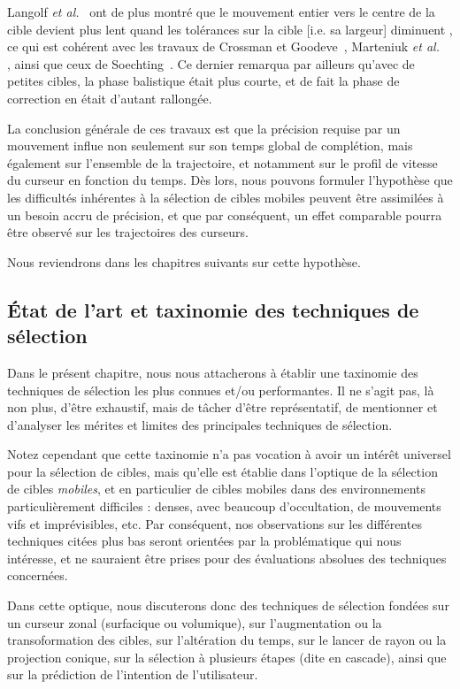	Langolf \emph{et al.}~\cite{langolf1976investigation} ont de plus montré que \og le mouvement entier vers le centre de la cible devient plus lent quand les tolérances sur la cible [i.e. sa largeur] diminuent \fg{}, ce qui est cohérent avec les travaux de Crossman et Goodeve~\cite{crossman1983feedback}, Marteniuk \emph{et al.}~ \cite{marteniuk1987constraints}, ainsi que ceux de Soechting~\cite{soechting1984effect}. Ce dernier remarqua par ailleurs qu'avec de petites cibles, la phase balistique était plus courte, et de fait la phase de correction en était d'autant rallongée.
	
	La conclusion générale de ces travaux est que la précision requise par un mouvement influe non seulement sur son temps global de complétion, mais également sur l'ensemble de la trajectoire, et notamment sur le profil de vitesse du curseur en fonction du temps. Dès lors, nous pouvons formuler l'hypothèse que les difficultés inhérentes à la sélection de cibles mobiles peuvent être assimilées à un besoin accru de précision, et que par conséquent, un effet comparable pourra être observé sur les trajectoires des curseurs.
	
	Nous reviendrons dans les chapitres suivants sur cette hypothèse.
	
	\subsection{État de l'art et taxinomie des techniques de sélection}
	Dans le présent chapitre, nous nous attacherons à établir une taxinomie des techniques de sélection les plus connues et/ou performantes. Il ne s'agit pas, là non plus, d'être exhaustif, mais de tâcher d'être représentatif, de mentionner et d'analyser les mérites et limites des principales techniques de sélection.
	
	Notez cependant que cette taxinomie n'a pas vocation à avoir un intérêt universel pour la sélection de cibles, mais qu'elle est établie dans l'optique de la sélection de cibles \emph{mobiles}, et en particulier de cibles mobiles dans des environnements particulièrement difficiles : denses, avec beaucoup d'occultation, de mouvements vifs et imprévisibles, etc. Par conséquent, nos observations sur les différentes techniques citées plus bas seront orientées par la problématique qui nous intéresse, et ne sauraient être prises pour des évaluations absolues des techniques concernées.
	
	Dans cette optique, nous discuterons donc des techniques de sélection fondées sur un curseur zonal (surfacique ou volumique), sur l'augmentation ou la transoformation des cibles, sur l'altération du temps, sur le lancer de rayon ou la projection conique, sur la sélection à plusieurs étapes (dite en cascade), ainsi que sur la prédiction de l'intention de l'utilisateur.
	
